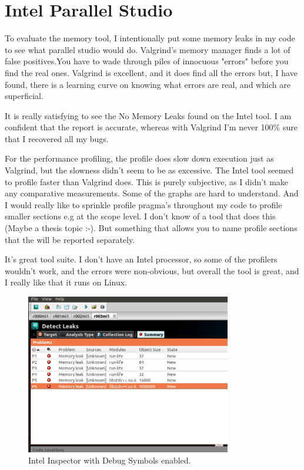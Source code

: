 \documentclass[journal,10pt,onecolumn,draftcls]{IEEEtran}
\begin{document}
\appendices
\section{Intel Parallel Studio}
To evaluate the memory tool, I intentionally put some memory leaks in my code 
to see what parallel studio would do.  Valgrind's memory manager finds a lot of 
false positives.You have to wade through piles of innocuous "errors" before you 
find the real ones. Valgrind is excellent, and it does find all the errors but, 
I have found, there is a learning curve on knowing what errors are real, and 
which are superficial. 

It is really satisfying to see the No Memory Leaks found on the Intel tool. I am 
confident that the report is accurate, whereas with Valgrind I'm never 100\% sure that I recovered all my bugs.

For the performance profiling, the profile does slow down execution just as 
Valgrind, but the slowness didn't seem to be as excessive.  The Intel tool 
seemed to profile faster than Valgrind does.  This is purely subjective, as 
I didn't make any comparative measurements.  Some of the graphs are hard to 
understand. And I would really like to sprinkle profile pragma's throughout my 
code to profile smaller sections e.g at the scope level. I don't know of a tool 
that does this (Maybe a thesis topic :-).  But something that allows you to name 
profile sections that the will be reported separately.  

It's great tool suite. I don't have an Intel processor, so some of the profilers 
wouldn't work, and the errors were non-obvious, but overall the tool is great, and 
I really like that it runs on Linux.

\begin{figure}[!t]
\begin{center}
\includegraphics[width=0.8\textwidth]{figures/fileMep7k0_Memory_Analysis.png}
\caption{Intel Inspector with Debug Symbols enabled.}
\label{fig:intentional_memory_leak}
\end{center}
\end{figure}


\listoffigures

\end{document}
